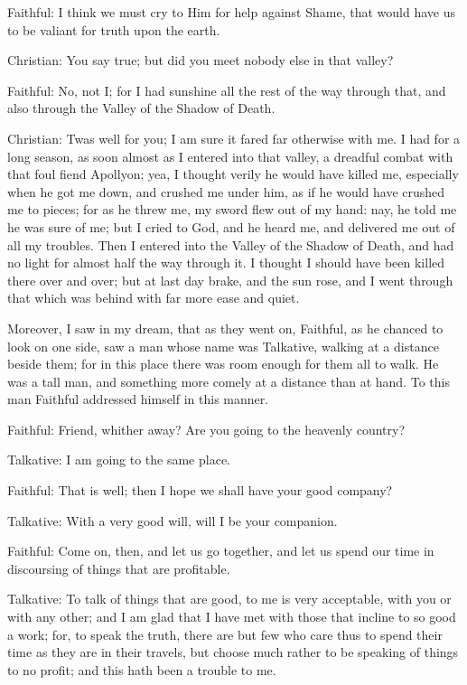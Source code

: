 Faithful: I think we must cry to Him for help against Shame, that would have us to be valiant for truth upon the earth.

Christian: You say true; but did you meet nobody else in that valley?

Faithful: No, not I; for I had sunshine all the rest of the way through that, and also through the Valley of the Shadow of Death.

Christian: Twas well for you; I am sure it fared far otherwise with me. I had for a long season, as soon almost as I entered into that valley, a dreadful combat with that foul fiend Apollyon; yea, I thought verily he would have killed me, especially when he got me down, and crushed me under him, as if he would have crushed me to pieces; for as he threw me, my sword flew out of my hand: nay, he told me he was sure of me; but I cried to God, and he heard me, and delivered me out of all my troubles. Then I entered into the Valley of the Shadow of Death, and had no light for almost half the way through it. I thought I should have been killed there over and over; but at last day brake, and the sun rose, and I went through that which was behind with far more ease and quiet.

Moreover, I saw in my dream, that as they went on, Faithful, as he chanced to look on one side, saw a man whose name was Talkative, walking at a distance beside them; for in this place there was room enough for them all to walk. He was a tall man, and something more comely at a distance than at hand. To this man Faithful addressed himself in this manner.

Faithful: Friend, whither away? Are you going to the heavenly country?

Talkative: I am going to the same place.

Faithful: That is well; then I hope we shall have your good company?

Talkative: With a very good will, will I be your companion.

Faithful: Come on, then, and let us go together, and let us spend our time in discoursing of things that are profitable.

Talkative: To talk of things that are good, to me is very acceptable, with you or with any other; and I am glad that I have met with those that incline to so good a work; for, to speak the truth, there are but few who care thus to spend their time as they are in their travels, but choose much rather to be speaking of things to no profit; and this hath been a trouble to me.

